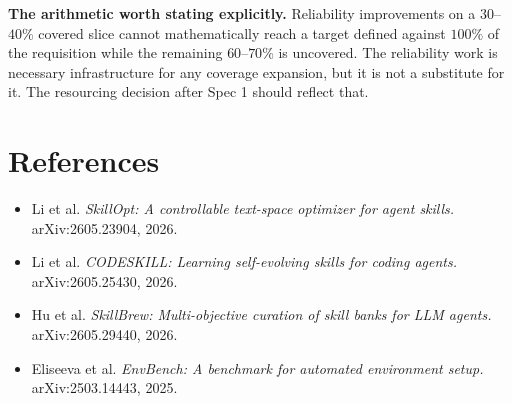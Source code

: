 \documentclass[11pt,a4paper]{article}
\begin{document}
\begin{keybox}
\textbf{The arithmetic worth stating explicitly.} Reliability
improvements on a \(30\)--\(40\%\) covered slice cannot mathematically
reach a target defined against \(100\%\) of the requisition while the
remaining \(60\)--\(70\%\) is uncovered. The reliability work is
necessary infrastructure for any coverage expansion, but it is not a
substitute for it. The resourcing decision after Spec 1 should reflect
that.
\end{keybox}

\section{References}

\begin{itemize}[leftmargin=1.4em]
  \item Li et al. \emph{SkillOpt: A controllable text-space optimizer
  for agent skills.} arXiv:2605.23904, 2026.
  \item Li et al. \emph{CODESKILL: Learning self-evolving skills for
  coding agents.} arXiv:2605.25430, 2026.
  \item Hu et al. \emph{SkillBrew: Multi-objective curation of skill
  banks for LLM agents.} arXiv:2605.29440, 2026.
  \item Eliseeva et al. \emph{EnvBench: A benchmark for automated
  environment setup.} arXiv:2503.14443, 2025.
\end{itemize}
\end{document}
